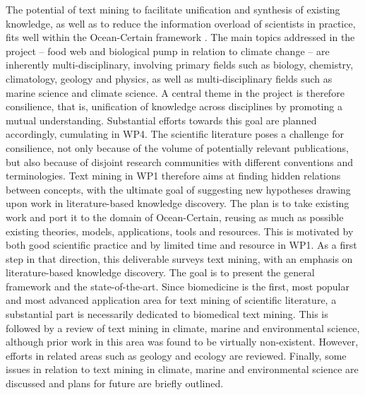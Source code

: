 The potential of text mining to facilitate unification and synthesis of existing knowledge, as well as to reduce the information overload of scientists in practice, fits well within the Ocean-Certain framework \citep{Olsen2013Ocean}.
The main topics addressed in the project -- food web and biological pump in relation to climate change -- are inherently multi-disciplinary, involving primary fields such as biology, chemistry, climatology, geology and physics, as well as  multi-disciplinary fields such as marine science and climate science.
A central theme in the project is therefore consilience, that is, unification of knowledge across disciplines by promoting a mutual understanding.
Substantial efforts towards this goal are planned accordingly, cumulating in WP4.
The scientific literature poses a challenge for consilience, not only because of the volume of potentially relevant publications, but also because of disjoint research communities with different conventions and terminologies.
Text mining in WP1 therefore aims at finding hidden relations between concepts, with the ultimate goal of suggesting new hypotheses drawing upon work in literature-based knowledge discovery.
The plan is to take existing work and port it to the domain of Ocean-Certain, reusing as much as possible existing theories, models, applications, tools and resources.
This is motivated by both good scientific practice and by limited time and resource in WP1.
As a first step in that direction, this deliverable surveys text mining, with an emphasis on literature-based knowledge discovery.
The goal is to present the general framework and the state-of-the-art.
Since biomedicine is the first, most popular and most advanced application area for text mining of scientific literature, a substantial part is necessarily dedicated to biomedical text mining.
This is followed by a review of text mining in climate, marine and environmental science, although prior work in this area was found to be virtually non-existent. 
However, efforts in related areas such as geology and ecology are reviewed.
Finally, some issues in relation to text mining in climate, marine and environmental science are discussed and plans for future are briefly outlined.

